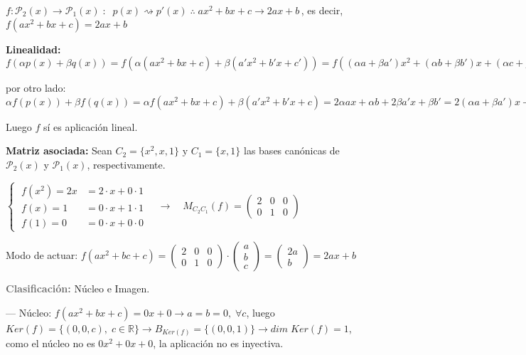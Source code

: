 \begin{proofw}\renewcommand{\qedsymbol}{$\diamond$}
	
	$f: \mathcal P_2(x) \to \mathcal P_1(x)\; :\; \; p(x) \rightsquigarrow p'(x) \; \therefore \; ax^2+bx+c \longrightarrow 2ax+b\,$, es decir, $f(ax^2+bx+c)=2ax+b$

\noindent \textcolor{gris}{\textbf{Linealidad:}} $f(\alpha p(x)+ \beta q(x))=f(\alpha (ax^2+bx+c)+\beta (a'x^2+b'x+c'))=f( (\alpha a + \beta a')x^2+(\alpha b + \beta b')x+(\alpha c+\beta c'))=2(\alpha a + \beta a')x+ (\alpha b + \beta b')$

\noindent por otro lado: $\alpha f(p(x))+\beta f(q(x))=\alpha f(ax^2+bx+c)+\beta (a'x^2+b'x+c)= 2\alpha a x+\alpha b+2\beta a' x+ \beta b'=2(\alpha a + \beta a')x+ (\alpha b + \beta b')$

\noindent Luego $f$ sí es aplicación lineal.

\noindent  \textcolor{gris}{\textbf{Matriz asociada:}} Sean $C_2=\{x^2,x,1\} \text{ y } C_1=\{x,1\}$ las bases canónicas de $\mathcal P_2(x)$ y $\mathcal P_1(x)$, respectivamente.

\noindent 

$ \begin{cases} \; f(x^2)=2x&=2\cdot x+ 0\cdot 1 \\
\; f(x)=1&=0\cdot x + 1 \cdot 1 \\ \; f(1)=0&=0\cdot x + 0 \cdot 0 \end{cases}  \quad \longrightarrow \quad M_{C_2C_1}(f)=\left( \begin{matrix} 2&0&0\\0&1&0 \end{matrix} \right)$

\noindent Modo de actuar:  $f(ax^2+bc+c)=\left( \begin{matrix} 2&0&0\\0&1&0 \end{matrix} \right) \cdot \left( \begin{matrix} a\\b\\c \end{matrix} \right)=\left( \begin{matrix} 2a\\b \end{matrix} \right)=2ax+b$

\noindent  \textcolor{DimGray}{\textbf{Clasificación:}} Núcleo e Imagen.

\noindent --- Núcleo: $f(ax^2+bx+c)=0x+0 \to a=b=0, \; \forall c$, luego $Ker(f)=\{(0,0,c),\; c\in \mathbb R \} \to B_{Ker(f)}=\{(0,0,1)\} \to dim \; Ker(f)=1$, como el núcleo no es $0x^2+0x+0$, la aplicación no es inyectiva.


\end{proofw}
